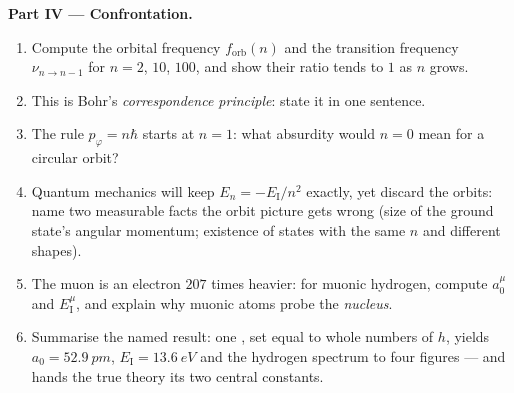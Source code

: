 \begin{problem}
\medskip\noindent\textbf{Part IV --- Confrontation.}
\begin{enumerate}[resume]
  \item Compute the orbital frequency $f_{\text{orb}}(n)$ and the
        transition frequency $\nu_{n \to n-1}$ for $n = 2$, $10$,
        $100$, and show their ratio tends to $1$ as $n$ grows.
  \item This is Bohr's \emph{correspondence principle}: state it in
        one sentence.
  \item The rule $p_\varphi = n\hbar$ starts at $n = 1$: what absurdity
        would $n = 0$ mean for a circular orbit?
  \item Quantum mechanics will keep $E_n = -E_{\text{I}}/n^2$ exactly,
        yet discard the orbits: name two measurable facts the orbit
        picture gets wrong (size of the ground state's angular
        momentum; existence of states with the same $n$ and different
        shapes).
  \item The muon is an electron $207$ times heavier: for muonic
        hydrogen, compute $a_0^\mu$ and $E_{\text{I}}^\mu$, and
        explain why muonic atoms probe the \emph{nucleus}.
  \item Summarise the named result: one , set equal
        to whole numbers of $h$, yields $a_0 = \qty{52.9}{pm}$,
        $E_{\text{I}} = \qty{13.6}{eV}$ and the hydrogen spectrum to
        four figures --- and hands the true theory its two central
        constants.
\end{enumerate}
\end{problem}

